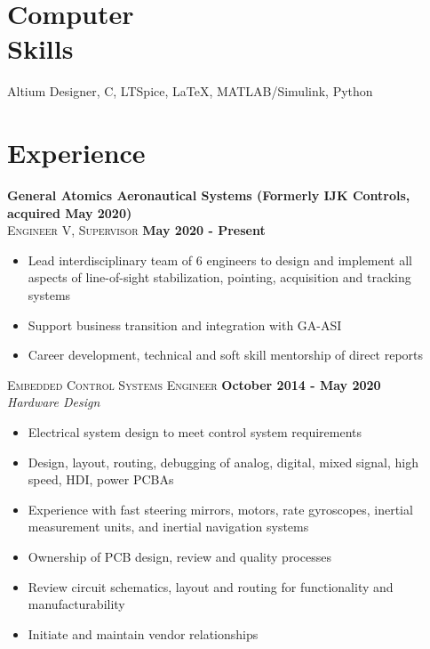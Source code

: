 \documentclass[margin,line]{resume}
\begin{document}
\begin{resume}
    \section{\mysidestyle Computer\\ Skills}

    Altium Designer, C, LTSpice, \LaTeX , MATLAB/Simulink, Python


    \section{\mysidestyle Experience}
    
    \textbf{General Atomics Aeronautical Systems (Formerly IJK Controls, acquired May 2020)}\\
    \textsc{Engineer V, Supervisor} \hfill \textbf{May 2020 - Present}\\ \vspace{-4mm}
    \begin{itemize} \itemsep -2pt
    		\item Lead interdisciplinary team of 6 engineers to design and implement all aspects of line-of-sight stabilization, pointing, acquisition and tracking systems
    		\item Support business transition and integration with GA-ASI
		\item Career development, technical and soft skill mentorship of direct reports
    	\end{itemize} \vspace{-2.25mm}
    	
    \textsc{Embedded Control Systems Engineer} \hfill \textbf{October 2014 - May 2020}\\ \vspace{-4mm}
    \textsl{Hardware Design}\\
    \begin{itemize} \itemsep -2pt
    		\item Electrical system design to meet control system requirements
        \item Design, layout, routing, debugging of analog, digital, mixed signal, high speed, HDI, power PCBAs
        \item Experience with fast steering mirrors, motors, rate gyroscopes, inertial measurement units, and inertial navigation systems
        \item Ownership of PCB design, review and quality processes
        \item Review circuit schematics, layout and routing for functionality and manufacturability
        \item Initiate and maintain vendor relationships
     \end{itemize}\vspace{-4mm}
     

\end{resume}
\end{document}
